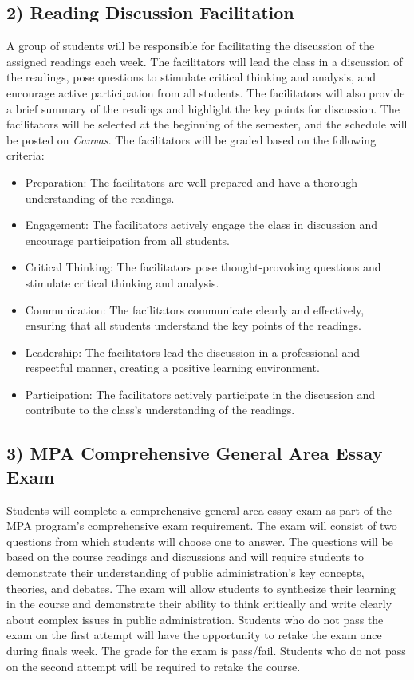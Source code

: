 \documentclass[12pt, letterpaper]{article}
\begin{document}
\subsection*{2) Reading Discussion Facilitation}
A group of students will be responsible for facilitating the discussion of the assigned readings each week. The facilitators will lead the class in a discussion of the readings, pose questions to stimulate critical thinking and analysis, and encourage active participation from all students. The facilitators will also provide a brief summary of the readings and highlight the key points for discussion. The facilitators will be selected at the beginning of the semester, and the schedule will be posted on \emph{Canvas}. The facilitators will be graded based on the following criteria:

\begin{itemize}
    \item Preparation: The facilitators are well-prepared and have a thorough understanding of the readings.
    \item Engagement: The facilitators actively engage the class in discussion and encourage participation from all students.
    \item Critical Thinking: The facilitators pose thought-provoking questions and stimulate critical thinking and analysis.
    \item Communication: The facilitators communicate clearly and effectively, ensuring that all students understand the key points of the readings.
    \item Leadership: The facilitators lead the discussion in a professional and respectful manner, creating a positive learning environment.
    \item Participation: The facilitators actively participate in the discussion and contribute to the class's understanding of the readings.
\end{itemize}

\subsection*{3) MPA Comprehensive General Area Essay Exam}

Students will complete a comprehensive general area essay exam as part of the MPA program's comprehensive exam requirement. The exam will consist of two questions from which students will choose one to answer. The questions will be based on the course readings and discussions and will require students to demonstrate their understanding of public administration's key concepts, theories, and debates. The exam will allow students to synthesize their learning in the course and demonstrate their ability to think critically and write clearly about complex issues in public administration. Students who do not pass the exam on the first attempt will have the opportunity to retake the exam once during finals week. The grade for the exam is pass/fail. Students who do not pass on the second attempt will be required to retake the course.
\end{document}
